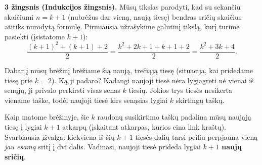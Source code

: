 \documentclass[11pt,a4paper]{scrartcl}
\begin{document}
\textbf{3 žingsnis (Indukcijos žingsnis).} Mūsų tikslas parodyti, kad su sekančiu skaičiumi $n = k+1$ (nubrėžus dar vieną, naują tiesę) bendras sričių skaičius atitiks nurodytą formulę. 
Pirmiausia užrašykime galutinį tikslą, kurį turime pasiekti (įsistatome $k+1$):
\begin{equation}
\frac{(k+1)^2 + (k+1) + 2}{2} = \frac{k^2 + 2k + 1 + k + 1 + 2}{2} = \frac{k^2 + 3k + 4}{2}.
\end{equation}

Dabar į mūsų brėžinį brėžiame šią naują, trečiąją tiesę (situacija, kai pridedame tiesę prie $k=2$). Ką ji padaro?
Kadangi naujoji tiesė nėra lygiagreti nė vienai iš senųjų, ji privalo perkirsti visas senas $k$ tiesių. Jokios trys tiesės nesikerta viename taške, todėl naujoji tiesė kirs senąsias lygiai $k$ skirtingų taškų.
\begin{center}
\end{center}

Kaip matome brėžinyje, šie $k$ raudonų susikirtimo taškų padalina mūsų naująją tiesę į lygiai $k+1$ atkarpų (įskaitant atkarpas, kurios eina link kraštų). Svarbiausia įžvalga: kiekviena iš šių $k+1$ tiesės dalių tarsi peiliu perpjauna vieną \textit{jau esamą} sritį į dvi dalis. Vadinasi, naujoji tiesė prideda lygiai \textbf{$k+1$ naujų sričių}.
\end{document}
